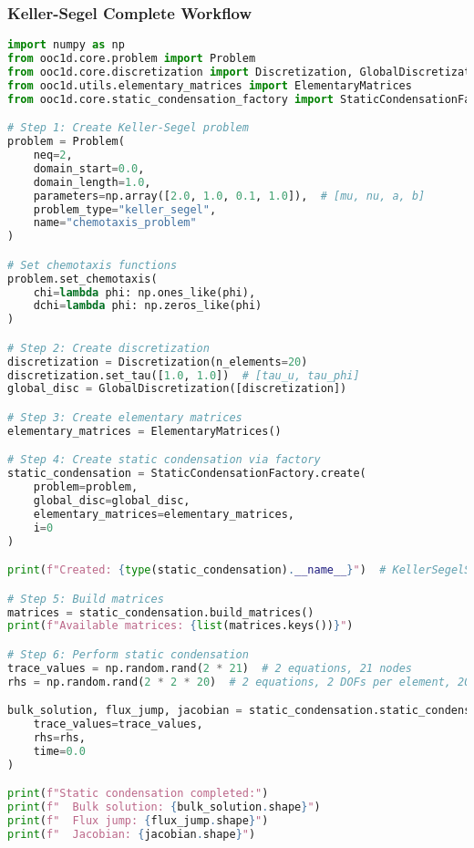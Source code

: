 \subsubsection{Keller-Segel Complete Workflow}

\begin{lstlisting}[language=Python, caption=Complete KellerSegel Workflow]
import numpy as np
from ooc1d.core.problem import Problem
from ooc1d.core.discretization import Discretization, GlobalDiscretization
from ooc1d.utils.elementary_matrices import ElementaryMatrices
from ooc1d.core.static_condensation_factory import StaticCondensationFactory

# Step 1: Create Keller-Segel problem
problem = Problem(
    neq=2,
    domain_start=0.0,
    domain_length=1.0,
    parameters=np.array([2.0, 1.0, 0.1, 1.0]),  # [mu, nu, a, b]
    problem_type="keller_segel",
    name="chemotaxis_problem"
)

# Set chemotaxis functions
problem.set_chemotaxis(
    chi=lambda phi: np.ones_like(phi),
    dchi=lambda phi: np.zeros_like(phi)
)

# Step 2: Create discretization
discretization = Discretization(n_elements=20)
discretization.set_tau([1.0, 1.0])  # [tau_u, tau_phi]
global_disc = GlobalDiscretization([discretization])

# Step 3: Create elementary matrices
elementary_matrices = ElementaryMatrices()

# Step 4: Create static condensation via factory
static_condensation = StaticCondensationFactory.create(
    problem=problem,
    global_disc=global_disc,
    elementary_matrices=elementary_matrices,
    i=0
)

print(f"Created: {type(static_condensation).__name__}")  # KellerSegelStaticCondensation

# Step 5: Build matrices
matrices = static_condensation.build_matrices()
print(f"Available matrices: {list(matrices.keys())}")

# Step 6: Perform static condensation
trace_values = np.random.rand(2 * 21)  # 2 equations, 21 nodes
rhs = np.random.rand(2 * 2 * 20)  # 2 equations, 2 DOFs per element, 20 elements

bulk_solution, flux_jump, jacobian = static_condensation.static_condensation(
    trace_values=trace_values,
    rhs=rhs,
    time=0.0
)

print(f"Static condensation completed:")
print(f"  Bulk solution: {bulk_solution.shape}")
print(f"  Flux jump: {flux_jump.shape}")
print(f"  Jacobian: {jacobian.shape}")
\end{lstlisting}

